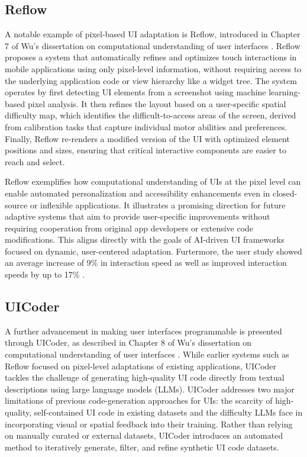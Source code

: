 \documentclass[openany]{book}
\begin{document}
\subsection{Reflow}
 
A notable example of pixel-based UI adaptation is Reflow, introduced in Chapter 7 of Wu's dissertation on computational understanding of user interfaces \cite{Wu2024}. Reflow proposes a system that automatically refines and optimizes touch interactions in mobile applications using only pixel-level information, without requiring access to the underlying application code or view hierarchy like a widget tree.
The system operates by first detecting UI elements from a screenshot using machine learning-based pixel analysis. It then refines the layout based on a user-specific spatial difficulty map, which identifies the difficult-to-access areas of the screen, derived from calibration tasks that capture individual motor abilities and preferences. Finally, Reflow re-renders a modified version of the UI with optimized element positions and sizes, ensuring that critical interactive components are easier to reach and select.

Reflow exemplifies how computational understanding of UIs at the pixel level can enable automated personalization and accessibility enhancements even in closed-source or inflexible applications. It illustrates a promising direction for future adaptive systems that aim to provide user-specific improvements without requiring cooperation from original app developers or extensive code modifications. This aligns directly with the goals of AI-driven UI frameworks focused on dynamic, user-centered adaptation. Furtermore, the user study showed an average increase of 9\% in interaction speed as well as improved interaction speeds by up to 17\% \cite{Wu2024}.

\subsection{UICoder}
A further advancement in making user interfaces programmable is presented through UICoder, as described in Chapter 8 of Wu’s dissertation on computational understanding of user interfaces \cite{Wu2024}. While earlier systems such as Reflow focused on pixel-level adaptations of existing applications, UICoder tackles the challenge of generating high-quality UI code directly from textual descriptions using large language models (LLMs).
UICoder addresses two major limitations of previous code-generation approaches for UIs: the scarcity of high-quality, self-contained UI code in existing datasets and the difficulty LLMs face in incorporating visual or spatial feedback into their training. Rather than relying on manually curated or external datasets, UICoder introduces an automated method to iteratively generate, filter, and refine synthetic UI code datasets.
\end{document}
